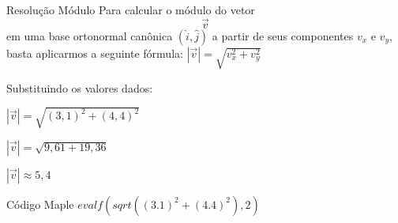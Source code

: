 Resolução Módulo
Para calcular o módulo do vetor $$\vec{v}$$ em uma base ortonormal canônica $(\hat{i}, \hat{j})$ a partir de seus componentes $v_{x}$ e $v_{y}$, basta aplicarmos a seguinte fórmula:
$|\vec{v}| = \sqrt{v_{x}^2 + v_{y}^2}$

Substituindo os valores dados:

$|\vec{v}| = \sqrt{(3,1)^2 + (4,4)^2}$

$|\vec{v}| = \sqrt{9,61 + 19,36}$

$|\vec{v}| \approx 5,4$


Código Maple
$evalf(sqrt((3.1)^2 + (4.4)^2), 2)$